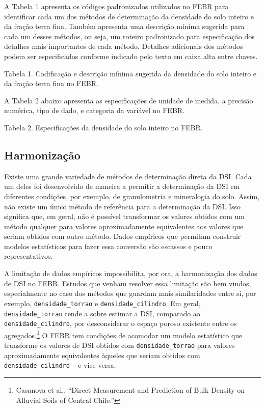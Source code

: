 \documentclass[a4paper,dvipsnames]{tufte-book}
\begin{document}
A Tabela 1 apresenta os códigos padronizados utilizados no FEBR para
identificar cada um dos métodos de determinação da densidade do solo
inteiro e da fração terra fina. Também apresenta uma descrição mínima
sugerida para cada um desses métodos, ou seja, um roteiro padronizado
para especificação dos detalhes mais importantes de cada método.
Detalhes adicionais dos métodos podem ser especificados conforme
indicado pelo texto em caixa alta entre chaves.

Tabela 1. Codificação e descrição mínima sugerida da densidade do solo
inteiro e da fração terra fina no FEBR.

A Tabela 2 abaixo apresenta as especificações de unidade de medida, a
precisão numérica, tipo de dado, e categoria da variável no FEBR.

Tabela 2. Especificações da densidade do solo inteiro no FEBR.

\subsection{Harmonização}\label{harmonizauxe7uxe3o}

Existe uma grande variedade de métodos de determinação direta da DSI.
Cada um deles foi desenvolvido de maneira a permitir a determinação da
DSI em diferentes condições, por exemplo, de granulometria e mineralogia
do solo. Assim, não existe um único método de referência para a
determinação da DSI. Isso significa que, em geral, não é possível
transformar os valores obtidos com um método qualquer para valores
aproximadamente equivalentes aos valores que seriam obtidos com outro
método. Dados empíricos que permitam construir modelos estatísticos para
fazer essa conversão são escassos e pouco representativos.

A limitação de dados empíricos impossibilita, por ora, a harmonização
dos dados de DSI no FEBR. Estudos que venham resolver essa limitação são
bem vindos, especialmente no caso dos métodos que guardam mais
similaridades entre si, por exemplo, \texttt{densidade\_torrao} e
\texttt{densidade\_cilindro}. Em geral, \texttt{densidade\_torrao} tende
a sobre estimar a DSI, comparado ao \texttt{densidade\_cilindro}, por
desconsiderar o espaço poroso existente entre os agregados.\footnote{Casanova
  et al., ``Direct Measurement and Prediction of Bulk Density on
  Alluvial Soils of Central Chile.''} O FEBR tem condições de acomodar
um modelo estatístico que transforme os valores de DSI obtidos com
\texttt{densidade\_torrao} para valores aproximadamente equivalentes
àqueles que seriam obtidos com \texttt{densidade\_cilindro} -- e
vice-versa.
\end{document}
